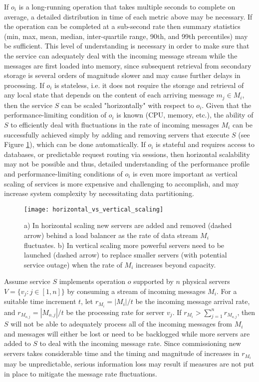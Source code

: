 If $o_i$ is a long-running operation that takes multiple seconds to complete on average, a detailed distribution in time of each metric above may be necessary. If the operation can be completed at a sub-second rate then summary statistics (min, max, mean, median, inter-quartile range, 90th, and 99th percentiles) may be sufficient. This level of understanding is necessary in order to make sure that the service can adequately deal with the incoming message stream while the messages are first loaded into memory, since subsequent retrieval from secondary storage is several orders of magnitude slower and may cause further delays in processing. If $o_i$ is stateless, i.e. it does not require the storage and retrieval of any local state that depends on the content of each arriving message $m_j \in M_i$, then the service $S$ can be scaled "horizontally"\autocite{vaquero2011dynamically} with respect to $o_i$. Given that the performance-limiting condition of $o_i$ is known (CPU, memory, etc.), the ability of $S$ to efficiently deal with fluctuations in the rate of incoming messages $M_i$ can be successfully achieved simply by adding and removing servers that execute $S$ (see Figure \ref{fig:horizontal_vs_vertical_scaling}), which can be done automatically\autocite{mao2011auto}. If $o_i$ is stateful and requires access to databases, or predictable request routing via sessions, then horizontal scalability may not be possible and thus, detailed understanding of the performance profile and performance-limiting conditions of $o_i$ is even more important as vertical scaling of services is more expensive and challenging to accomplish, and may increase system complexity by necessitating data partitioning\autocite{vaquero2011dynamically}.

\begin{figure}[H]
\texttt{[image: horizontal\_vs\_vertical\_scaling]}
\centering
\caption {a) In horizontal scaling new servers are added and removed (dashed arrow) behind a load balancer as the rate of data stream $M_i$ fluctuates. b) In vertical scaling more powerful servers need to be launched (dashed arrow) to replace smaller servers (with potential service outage) when the rate of $M_i$ increases beyond capacity.}
\label{fig:horizontal_vs_vertical_scaling}
\end{figure}

Assume service $S$ implements operation $o$ supported by $n$ physical servers $V = \{v_j: j \in [1,n]\}$ by consuming a stream of incoming messages $M_i$. For a suitable time increment $t$, let $r_{M_i} = |M_i|/t$ be the incoming message arrival rate, and $r_{M_{o,j}} = |M_{o,j}|/t$ be the processing rate for server $v_j$. If $r_{M_i} > \sum_{j=1}^n r_{M_{o,j}}$, then $S$ will not be able to adequately process all of the incoming messages from $M_i$ and messages will either be lost or need to be backlogged while more servers are added to $S$ to deal with the incoming message rate. Since commissioning new servers takes considerable time and the timing and magnitude of increases in $r_{M_i}$ may be unpredictable, serious information loss may result if measures are not put in place to mitigate the message rate fluctuations. 

